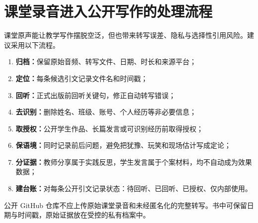 \chapter{课堂录音进入公开写作的处理流程}

课堂原声能让教学写作摆脱空泛，但也带来转写误差、隐私与选择性引用风险。建议采用以下流程。

\begin{enumerate}
  \item \textbf{归档：}保留原始音频、转写文件、日期、时长和来源平台；
  \item \textbf{定位：}每条候选引文记录文件名和时间戳；
  \item \textbf{回听：}正式出版前回听关键句，修正自动转写错误；
  \item \textbf{去识别：}删除姓名、班级、账号、个人经历等非必要信息；
  \item \textbf{取授权：}公开学生作品、长篇发言或可识别经历前取得授权；
  \item \textbf{保语境：}同时记录前后问题，避免把犹豫、玩笑和现场估计写成定论；
  \item \textbf{分证据：}教师分享属于实践反思，学生发言属于个案材料，均不自动成为效果数据；
  \item \textbf{建台账：}对每条公开引文记录状态：待回听、已回听、已授权、仅内部使用。
\end{enumerate}

\begin{tech-note}
公开 GitHub 仓库不应上传原始课堂录音和未经匿名化的完整转写。书中可保留日期与时间戳，原始证据放在受控的私有档案中。
\end{tech-note}
